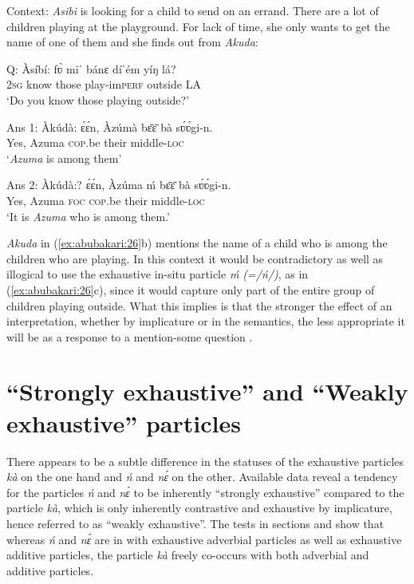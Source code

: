\documentclass[output=paper,modfonts,nonflat,
 hidelinks
]{langsci/langscibook}
\begin{document}
 
\ea\label{ex:abubakari:26} 
Context: \textit{Asibi} is looking for a child to send on an errand. There are a lot of children playing at the playground. For lack of time, she only wants to get the name of one of them and she finds out from \textit{Akuda}:
 
\ea\label{ex:abubakari:26a}
Q: Àsíbí: \gll fʋ̀  mīˈ  bánɛ  díˈém    yíŋ lá?\\
2\textsc{sg}  know  those  play-im\textsc{perf}  outside LA\\
\glt ‘Do you know those playing outside?’

\ex\label{ex:abubakari:26b} 
Ans 1: Àkúdà: \gll ɛ́ɛ́n,  Àzúmà  bɛ̄ɛ̄    bà sʋ́ʋ́gi-n. \\
Yes,  Azuma  \textsc{cop}.be    their middle-\textsc{loc}\\
\glt ‘\textit{Azuma} is among them’
 
\ex\label{ex:abubakari:26c}
Ans 2: Àkúdà:? \gll ɛ́ɛ́n,  Àzúma  ḿ  bɛ̄ɛ̄ bà  sʋ́ʋ́gi-n.\\
Yes,  Azuma  \textsc{foc}  \textsc{cop}.be   their  middle-\textsc{loc}\\
\glt ‘It is \textit{Azuma} who is among them.’
\z
\z

\textit{Akuda} in (\ref{ex:abubakari:26}b) mentions the name of a child who is among the children who are playing. In this context it would be contradictory as well as illogical to use the exhaustive in-situ  particle \textit{ḿ (=/ń/)}, as in (\ref{ex:abubakari:26}c), since it would capture only part of the entire group of children playing outside. What this implies is that the stronger the effect of an  interpretation, whether by implicature or in the semantics, the less appropriate it will be as a response to a mention-some question \citep[see][10]{vanderWal2013}.

\section{``Strongly exhaustive'' and  ``Weakly exhaustive'' particles}

There appears to be a subtle difference in the statuses of the exhaustive particles \textit{kà} on the one hand and \textit{ń} and \textit{nɛ́} on the other. Available data reveal a tendency for the particles \textit{ń} and \textit{nɛ́} to be inherently ``strongly exhaustive'' compared to the particle \textit{kà}, which is only inherently contrastive and exhaustive by implicature, hence referred to as ``weakly exhaustive''. The tests in sections  and  show that whereas \textit{ń} and \textit{nɛ́} are in  with exhaustive adverbial particles as well as exhaustive additive particles, the particle \textit{kà} freely co-occurs with both adverbial and additive particles. 
\end{document}
